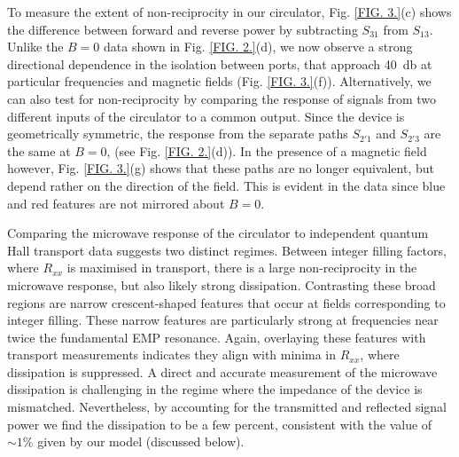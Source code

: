 To measure the extent of non-reciprocity in our circulator, Fig. \ref{FIG. 3.}(c) shows the difference between forward and reverse power by subtracting $S_{31}$ from $S_{13}$. Unlike the $B = 0$ data shown in Fig. \ref{FIG. 2.}(d), we now observe a strong directional dependence in the isolation between ports, that approach \SI{40}{\decibel} at particular frequencies and magnetic fields (Fig. \ref{FIG. 3.}(f)). Alternatively, we can also test for non-reciprocity by comparing the response of signals from two different inputs of the circulator to a common output. Since the device is geometrically symmetric, the response from the separate paths $S_{2'1}$ and $S_{2'3}$ are the same at $B = 0$, (see Fig. \ref{FIG. 2.}(d)). In the presence of a magnetic field however, Fig. \ref{FIG. 3.}(g) shows that these paths are no longer equivalent, but depend rather on the direction of the field. This is evident in the data since blue and red features are not mirrored about $B = 0$.

Comparing the microwave response of the circulator to independent quantum Hall transport data suggests  two distinct regimes. Between integer filling factors, where $R_{xx}$ is maximised in transport, there is a large non-reciprocity in the microwave response, but also likely strong dissipation. Contrasting these broad regions are narrow crescent-shaped features that occur at fields corresponding to integer filling. These narrow features are particularly strong at frequencies near twice the fundamental EMP resonance. Again, overlaying these features with transport measurements indicates they align with minima in $R_{xx}$, where dissipation is suppressed. A direct and accurate measurement of the microwave dissipation is challenging in the regime where the impedance of the device is mismatched. Nevertheless, by accounting for the transmitted and reflected signal power we find the dissipation to be a few percent, consistent with the value of $\sim 1\%$ given by our model (discussed below).

